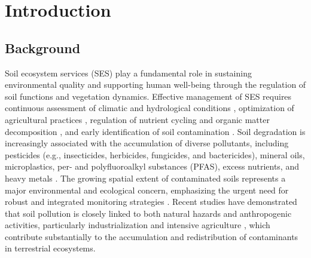 \documentclass[sn-mathphys-num]{sn-jnl}
\begin{document}
\section{Introduction}\label{sec1}

\subsection{Background}\label{sec1.1}

Soil ecosystem services (SES) play a fundamental role in sustaining environmental quality and supporting human well-being through the regulation of soil functions and vegetation dynamics. Effective management of SES requires continuous assessment of climatic and hydrological conditions \cite{Lal2020,Robinson2014}, optimization of agricultural practices \cite{Hepperly2009,Rahman2014}, regulation of nutrient cycling and organic matter decomposition \cite{Atoloye2024,Ma2024,Vishwanath2025}, and early identification of soil contamination \cite{Pan2019,Fan2025,Lemenkova2025b,Proshad2025}. Soil degradation is increasingly associated with the accumulation of diverse pollutants, including pesticides (e.g., insecticides, herbicides, fungicides, and bactericides), mineral oils, microplastics, per- and polyfluoroalkyl substances (PFAS), excess nutrients, and heavy metals \cite{Shen2024,Guan2024,Baghaie2020,Luo2017}. The growing spatial extent of contaminated soils represents a major environmental and ecological concern, emphasizing the urgent need for robust and integrated monitoring strategies \cite{Liu2020,Zhang2021,Lemenkova2025d}. Recent studies have demonstrated that soil pollution is closely linked to both natural hazards and anthropogenic activities, particularly industrialization \cite{Rosskopfova2012,Guo2025,Zhang2022} and intensive agriculture \cite{Hepperly2009,Rahman2014,Pan2019}, which contribute substantially to the accumulation and redistribution of contaminants in terrestrial ecosystems.
\end{document}
